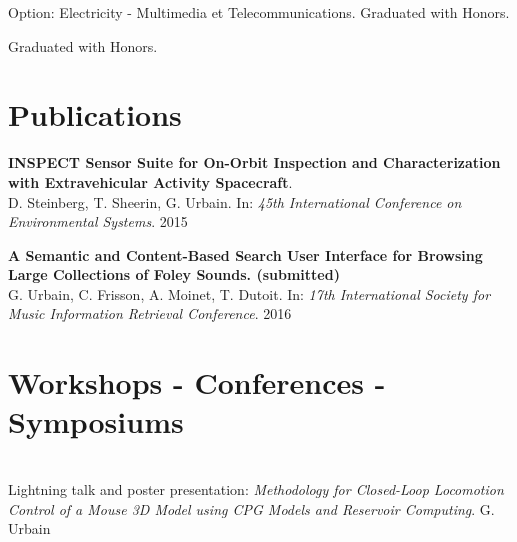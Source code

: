 \documentclass[a4paper]{deedy-resume} %
\begin{document}
\vspace{10pt}

\vspace{2pt}
Option: Electricity - Multimedia et Telecommunications.
Graduated with Honors.

\vspace{3pt}
Graduated with Honors.

\sectionspace %


\section{Publications}
\vspace{5pt}
\textbf{INSPECT Sensor Suite for On-Orbit Inspection and Characterization with Extravehicular Activity Spacecraft}.\\
D. Steinberg, T. Sheerin, G. Urbain. In: \textit{45th International Conference on Environmental Systems}. 2015

\vspace{5pt}
\textbf{A Semantic and Content-Based Search User Interface for Browsing Large Collections of Foley Sounds. (submitted)}\\
G. Urbain, C. Frisson, A. Moinet, T. Dutoit. In: \textit{17th International Society for Music Information Retrieval Conference}. 2016

\sectionspace %
\vspace{5pt}

\section{Workshops - Conferences - Symposiums}
\vspace{5pt}
\\
Lightning talk and poster presentation: \textit{Methodology for Closed-Loop Locomotion Control of a Mouse 3D Model using CPG Models and Reservoir Computing}. G. Urbain
\end{document}
